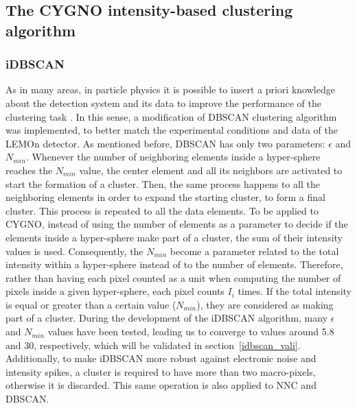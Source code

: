 \documentclass[a4paper,11pt]{article}
\begin{document}
\subsection{The CYGNO intensity-based clustering algorithm}
\label{sec:dbscan}


\subsubsection{iDBSCAN}

As in many areas, in particle physics it is possible to insert a priori knowledge about the detection system and its data to improve the performance of the clustering task \cite{wagstaff2000clustering}. In this sense, a modification of DBSCAN \cite{scikit-learn} clustering algorithm was implemented, to better match the experimental conditions and data of the LEMOn detector.
As mentioned before, DBSCAN has only two parameters: $\epsilon$ and $N_{min}$. Whenever the number of neighboring elements inside a hyper-sphere reaches the $N_{min}$ value, the center element and all its neighbors are activated to start the formation of a cluster.
Then, the same process happens to all the neighboring elements in order to expand the starting cluster, to form a final cluster. This process is repeated to all the data elements.
To be applied to CYGNO, instead of using the number of elements as a parameter to decide if the elements inside a hyper-sphere make part of a cluster, the sum of their intensity values is used. Consequently, the $N_{min}$ become a parameter related to the total intensity within a hyper-sphere instead of to the number of elements.
Therefore, rather than having each pixel counted as a unit when computing the number of pixels inside a given hyper-sphere, each pixel counts $I_i$ times.
If the total intensity is equal or greater than a certain value ($N_{min}$), they are considered as making part of a cluster.
During the development of the iDBSCAN algorithm, many $\epsilon$ and $N_{min}$ values have been tested, leading us to converge to values around 5.8 and 30, respectively, which will be validated in section~\ref{idbscan_vali}.
Additionally, to make iDBSCAN more robust against electronic noise and intensity spikes, a cluster is required to have more than two macro-pixels, otherwise it is discarded. This same operation is also applied to NNC and DBSCAN.
\end{document}
